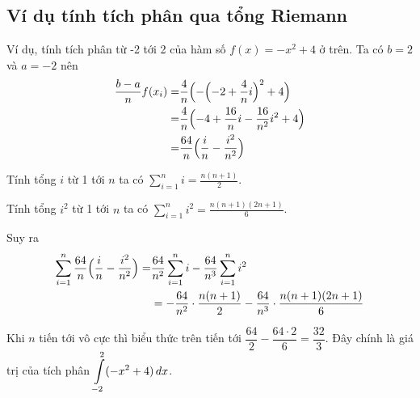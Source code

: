 \subsection*{Ví dụ tính tích phân qua tổng Riemann}

Ví dụ, tính tích phân từ -2 tới 2 của hàm số $f(x) = -x^2 + 4$ ở trên. Ta có $b = 2$ và $a = -2$ nên \begin{align*}
	\frac{b-a}{n} f(x_i) = & \frac{4}{n} \Bigl(-\Bigl(-2+\frac{4}{n} i\Bigr)^2 + 4\Bigr) \\ = & \frac{4}{n}\Bigl( -4 + \frac{16}{n} i - \frac{16}{n^2} i^2 + 4\Bigr) \\ = & \frac{64}{n} \Bigl( \frac{i}{n} - \frac{i^2}{n^2} \Bigr)
\end{align*}

Tính tổng $i$ từ 1 tới $n$ ta có $\displaystyle{\sum_{i=1}^{n} i = \frac{n(n+1)}{2}}$.

Tính tổng $i^2$ từ 1 tới $n$ ta có $\displaystyle{\sum_{i=1}^{n} i^2 = \frac{n(n+1)(2n+1)}{6}}$.

Suy ra
\begin{align*}
	\sum_{i=1}^n \frac{64}{n} \Bigl(\frac{i}{n} - \frac{i^2}{n^2}\Bigr) = & \frac{64}{n^2} \sum_{i=1}^n i - \frac{64}{n^3} \sum_{i=1}^{n} i^2 \\ & = -\frac{64}{n^2} \cdot \frac{n(n+1)}{2} - \frac{64}{n^3} \cdot \frac{n(n+1)(2n+1)}{6}
\end{align*}

Khi $n$ tiến tới vô cực thì biểu thức trên tiến tới $\dfrac{64}{2} - \dfrac{64 \cdot 2}{6} = \dfrac{32}{3}$. Đây chính là giá trị của tích phân $\displaystyle{\int\displaylimits_{-2}^2 (-x^2 + 4) \, dx}$.